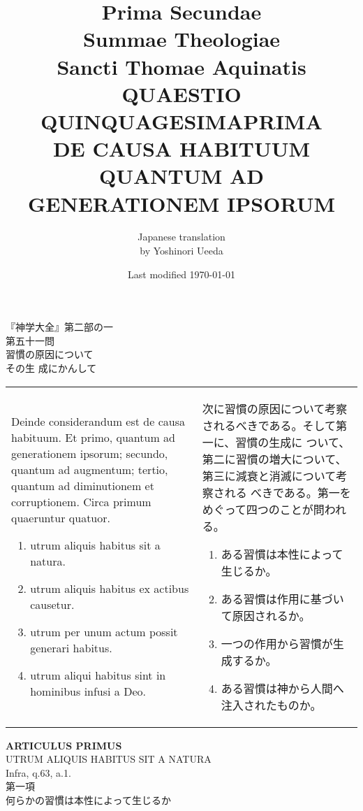 \documentclass[10pt]{jsarticle} %
\title{{\bf Prima Secundae}\\{\HUGE Summae Theologiae}\\Sancti Thomae
Aquinatis\\{\sffamily QUAESTIO QUINQUAGESIMAPRIMA}\\{\bf DE CAUSA
HABITUUM QUANTUM AD GENERATIONEM IPSORUM}}
\author{Japanese translation\\by Yoshinori {\sc Ueeda}}
\date{Last modified \today}
\begin{document}
\maketitle
\thispagestyle{empty}
\begin{center}
{\Large 『神学大全』第二部の一\\第五十一問\\習慣の原因について\\その生
 成にかんして}
\end{center}


\begin{longtable}{p{21em}p{21em}}

Deinde considerandum est de causa habituum. Et primo, quantum ad
generationem ipsorum; secundo, quantum ad augmentum; tertio, quantum
ad diminutionem et corruptionem. Circa primum quaeruntur
quatuor. 


\begin{enumerate}
 \item utrum aliquis habitus sit a natura.
 \item utrum aliquis habitus ex actibus causetur.
 \item utrum per unum actum possit generari habitus.
 \item utrum aliqui habitus sint in hominibus infusi a Deo.
\end{enumerate}

&

次に習慣の原因について考察されるべきである。そして第一に、習慣の生成に
 ついて、第二に習慣の増大について、第三に減衰と消滅について考察される
 べきである。第一をめぐって四つのことが問われる。

\begin{enumerate}
 \item ある習慣は本性によって生じるか。
 \item ある習慣は作用に基づいて原因されるか。
 \item 一つの作用から習慣が生成するか。
 \item ある習慣は神から人間へ注入されたものか。
\end{enumerate}
\end{longtable}
\newpage
{}
\begin{center}
{\Large {\bf ARTICULUS PRIMUS}}\\
{\large UTRUM ALIQUIS HABITUS SIT A NATURA}\\
{\footnotesize Infra, q.63, a.1.}\\
{\Large 第一項\\何らかの習慣は本性によって生じるか}
\end{center}
\end{document}
